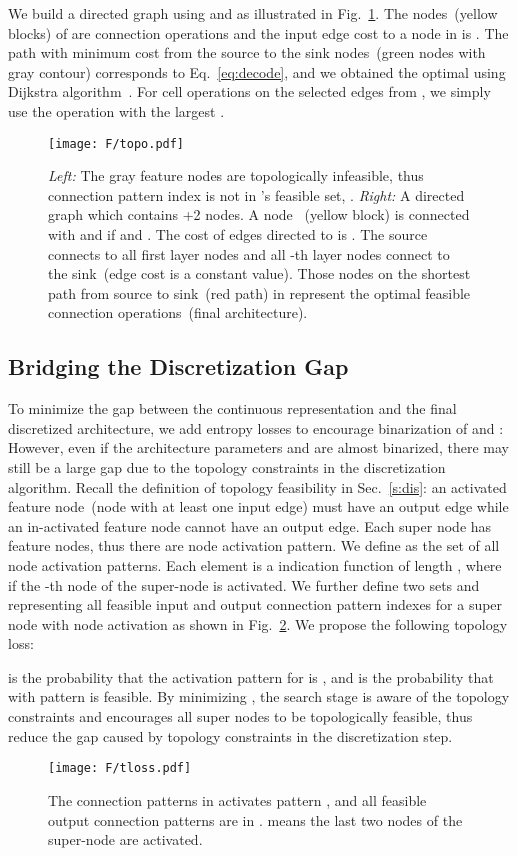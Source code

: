 \documentclass[final]{cvpr}
\begin{document}
  We build a directed graph  using  and  as illustrated in Fig.~\ref{fig:tp}. The nodes~(yellow blocks) of  are connection operations and the input edge cost to a node  in  is . The path with minimum cost from the source to the sink nodes~(green nodes with gray contour) corresponds to Eq.~\ref{eq:decode}, and we obtained the optimal  using Dijkstra algorithm~\cite{dijkstra1959note}. For cell operations on the selected edges from , we simply use the operation with the largest .
\begin{figure}
\begin{center}
\texttt{[image: F/topo.pdf]}
\end{center}
\caption{\emph{Left:} The gray feature nodes are topologically infeasible, thus connection pattern index  is not in 's feasible set, .
\emph{Right:} A directed graph  which contains +2 nodes. A node ~(yellow block) is connected with  and  if  and . The cost of edges directed to  is . The source connects to all first layer nodes and all -th layer nodes connect to the sink~(edge cost is a constant value).  Those  nodes on the shortest path from source to sink~(red path) in   represent the optimal feasible connection operations~(final architecture).}
\label{fig:tp}
\end{figure}
\subsection{Bridging the Discretization Gap}
\label{s:decode}
To minimize the gap between the continuous representation and the final discretized architecture, we add entropy losses to encourage binarization of  and : 
However, even if the architecture parameters  and  are almost binarized, there may still be a large gap due to the topology constraints in the discretization algorithm. Recall the definition of topology feasibility in Sec.~\ref{s:dis}: an activated feature node~(node with at least one input edge) must have an output edge while an in-activated feature node cannot have an output edge. Each super node has  feature nodes, thus there are  node activation pattern. We define  as the set of all node activation patterns. Each element  is a indication function of length , where  if the -th node of the super-node is activated. We further define two sets  and  representing all feasible input and output connection pattern indexes for a super node with node activation  as shown in Fig.~\ref{fig:tploss}. We propose the following topology loss:

 is the probability that the activation pattern for  is , and  is the probability that  with pattern  is feasible. By minimizing , the search stage is aware of the topology constraints and encourages all super nodes to be topologically feasible, thus reduce the gap caused by topology constraints in the discretization step.
\begin{figure}
\begin{center}
\texttt{[image: F/tloss.pdf]}
\end{center}
  \caption{The connection patterns in  activates pattern , and all feasible output connection patterns are in .  means the last two nodes of the super-node are activated.}
\label{fig:tploss}
\end{figure}
\end{document}
